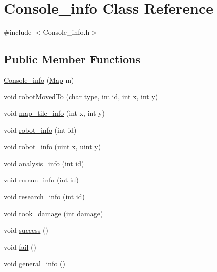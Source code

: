 \hypertarget{class_console__info}{\section{Console\-\_\-info Class Reference}
\label{class_console__info}
}


{\ttfamily \#include $<$Console\-\_\-info.\-h$>$}

\subsection*{Public Member Functions}
\begin{DoxyCompactItemize}
\item 
\hyperlink{class_console__info_aa3e98bbb783ce050426ebd5ee8ce17e8}{Console\-\_\-info} (\hyperlink{class_map}{Map} m)
\item 
void \hyperlink{class_console__info_adf9b1b99dbecf11b50862618f0b5e2ad}{robot\-Moved\-To} (char type, int id, int x, int y)
\item 
void \hyperlink{class_console__info_a050bd493a7c149a9c70680170d19595a}{map\-\_\-tile\-\_\-info} (int x, int y)
\item 
void \hyperlink{class_console__info_ac1231a972e38ec0f7142a20641cb7663}{robot\-\_\-info} (int id)
\item 
void \hyperlink{class_console__info_a2ade25393df6aab1fa014363b002b372}{robot\-\_\-info} (\hyperlink{_robot__management_8h_a4d3943ddea65db7163a58e6c7e8df95a}{uint} x, \hyperlink{_robot__management_8h_a4d3943ddea65db7163a58e6c7e8df95a}{uint} y)
\item 
void \hyperlink{class_console__info_a261e6ecc446e58253dcf2df814c62d61}{analysis\-\_\-info} (int id)
\item 
void \hyperlink{class_console__info_a10e4c45fbe8b8fab856b15fc6283a191}{rescue\-\_\-info} (int id)
\item 
void \hyperlink{class_console__info_ae39b4f0b5455c9c554942119b0f89060}{research\-\_\-info} (int id)
\item 
void \hyperlink{class_console__info_a2984a90ee439b84e463f763c42df0ff8}{took\-\_\-damage} (int damage)
\item 
void \hyperlink{class_console__info_ac75c6db03c6bda9b33de56696b6a18d4}{success} ()
\item 
void \hyperlink{class_console__info_a29875cecf1aa23eceac4bb46d4df7598}{fail} ()
\item 
void \hyperlink{class_console__info_afa4567c4eeccc5ea70fe33a0bcfef4fd}{general\-\_\-info} ()
\end{DoxyCompactItemize}


